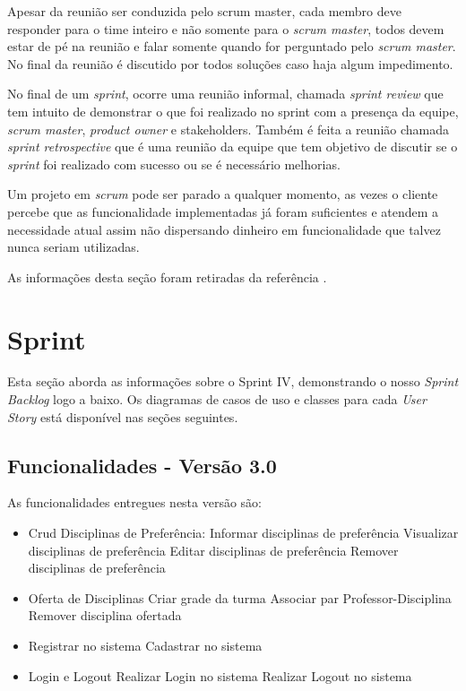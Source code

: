 \documentclass{abnt}
\begin{document}
			Apesar da reunião ser conduzida pelo scrum master, cada membro deve responder para o time inteiro e não somente para o
			\emph{scrum master}, todos devem estar de pé na reunião e falar somente quando for perguntado pelo \emph{scrum master}. No final da
			reunião é discutido por todos soluções caso haja algum impedimento.
			
			No final de um \emph{sprint}, ocorre uma reunião informal, chamada \emph{sprint review} que tem intuito de demonstrar o que foi 
			realizado no sprint com a presença da equipe, \emph{scrum master}, \emph{product owner} e stakeholders. Também é feita a reunião chamada \emph{sprint retrospective}
			que é uma reunião da equipe que tem objetivo de discutir se o \emph{sprint} foi realizado com sucesso ou se é necessário melhorias.
			
			Um projeto em \emph{scrum} pode ser parado a qualquer momento, as vezes o cliente percebe que as funcionalidade implementadas já foram
			suficientes e atendem a necessidade atual assim não dispersando dinheiro em funcionalidade que talvez nunca seriam utilizadas.
			
			As informações desta seção foram retiradas da referência \cite{SCRUMEPF}.
	
		
		

\clearpage

\chapter{Sprint}
	
		Esta seção aborda as informações sobre o Sprint IV, demonstrando o nosso \emph{Sprint Backlog} logo a baixo. Os diagramas de casos de uso e classes para cada \emph{User Story} está disponível nas seções seguintes.
	
			
		\section{Funcionalidades - Versão 3.0}
		
			As funcionalidades entregues nesta versão são:
		
			\begin{itemize} 
			\item Crud Disciplinas de Preferência:
			\subitem Informar disciplinas de preferência
			\subitem Visualizar disciplinas de preferência
			\subitem Editar disciplinas de preferência
			\subitem Remover disciplinas de preferência
			
			\item Oferta de Disciplinas
			\subitem Criar grade da turma
			\subitem Associar par Professor-Disciplina
			\subitem Remover disciplina ofertada
			
			\item Registrar no sistema
			\subitem Cadastrar no sistema
			
			\item Login e Logout 
			\subitem Realizar Login no sistema
			\subitem Realizar Logout no sistema
			
			\end{itemize}
			
\end{document}

